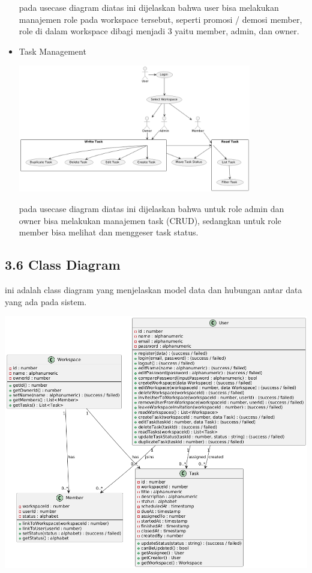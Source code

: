 \begin{itemize}
\begin{center}
  \end{center}
  pada usecase diagram diatas ini dijelaskan bahwa user bisa melakukan manajemen role pada workspace tersebut, seperti promosi / demosi member, role di dalam workspace dibagi menjadi 3 yaitu member, admin, dan owner.
  \item Task Management
  \begin{center}
    \includegraphics[width=0.8\textwidth]{assets/usecase_diagrams/task.png}
  \end{center}
  pada usecase diagram diatas ini dijelaskan bahwa untuk role admin dan owner bisa melakukan manajemen task (CRUD),
  sedangkan untuk role member bisa melihat dan menggeser task status.
\end{itemize}

\subsection*{3.6 Class Diagram}
ini adalah class diagram yang menjelaskan model data dan hubungan antar data yang ada pada sistem.
\begin{center}
  \includegraphics[width=1\textwidth]{assets/class_diagram.png}
\end{center}

